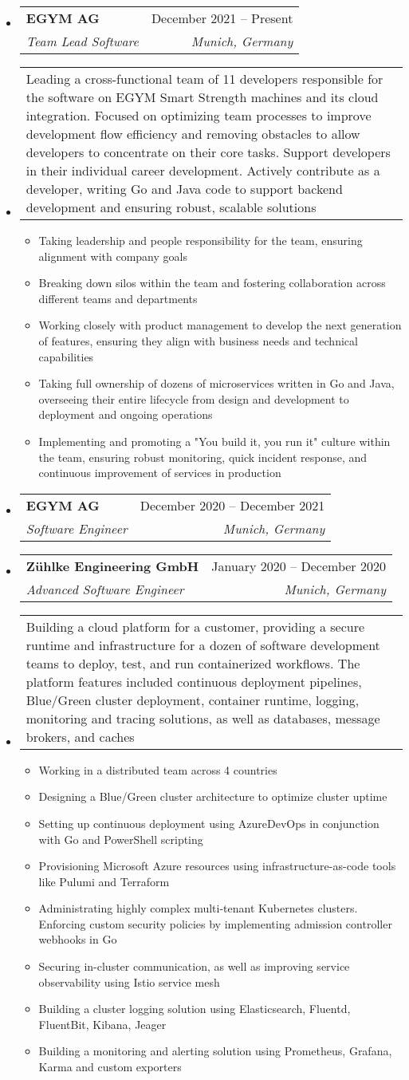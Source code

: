 \documentclass[letterpaper,12pt]{article}
\makeatletter
\newcommand{\resumeEntryStart}{\vspace{0.5\baselineskip}\begin{minipage}{\textwidth}\begin{itemize}[leftmargin=2.5mm]}
\newcommand{\resumeEntryEnd}{\end{itemize}\end{minipage}\vspace{1\baselineskip}}
\newcommand{\resumeItemListStart}{\begin{itemize}[leftmargin=4.5mm]}
\newcommand{\resumeItemListEnd}{\end{itemize}}
\newcommand{\resumeItem}[1]{
  \item\small{
    {#1 \vspace{-2pt}}
  }
}
\newcommand{\resumeEntryTSDL}[4]{
  \vspace{-1pt}\item[]
    \begin{tabularx}{0.97\textwidth}{X@{\hspace{60pt}}r}
      \textbf{\color{primary}#1} & {\color{accent}\small#2} \\
      \textit{\color{accent}\small#3} & \textit{\color{accent}\small#4} \\
    \end{tabularx}\vspace{-6pt}
}
\newcommand{\resumeEntryDesc}[1]{
  \vspace{-1pt}\item[] 
  \small{
    \begin{tabularx}{0.97\textwidth}{X}
      #1
    \end{tabularx}
  }
  \vspace{-6pt}
}
\makeatother
\begin{document}
  \resumeEntryStart
    \resumeEntryTSDL
      {EGYM AG}{December 2021 -- Present}
      {Team Lead Software}{Munich, Germany}
    \resumeEntryDesc{Leading a cross-functional team of 11 developers responsible for the software on EGYM Smart Strength machines and its cloud integration. Focused on optimizing team processes to improve development flow efficiency and removing obstacles to allow developers to concentrate on their core tasks. Support developers in their individual career development. Actively contribute as a developer, writing Go and Java code to support backend development and ensuring robust, scalable solutions}
    \resumeItemListStart
    \resumeItem {Taking leadership and people responsibility for the team, ensuring alignment with company goals}
    \resumeItem {Breaking down silos within the team and fostering collaboration across different teams and departments}
    \resumeItem {Working closely with product management to develop the next generation of features, ensuring they align with business needs and technical capabilities}
    \resumeItem {Taking full ownership of dozens of microservices written in Go and Java, overseeing their entire lifecycle from design and development to deployment and ongoing operations}
    \resumeItem {Implementing and promoting a "You build it, you run it" culture within the team, ensuring robust monitoring, quick incident response, and continuous improvement of services in production}
    \resumeItemListEnd
  \resumeEntryEnd

  \resumeEntryStart
    \resumeEntryTSDL
      {EGYM AG}{December 2020 -- December 2021}
      {Software Engineer}{Munich, Germany}
  \resumeEntryEnd

  \resumeEntryStart
    \resumeEntryTSDL
      {Zühlke Engineering GmbH}{January 2020 -- December 2020}
      {Advanced Software Engineer}{Munich, Germany}
    \resumeEntryDesc{Building a cloud platform for a customer, providing a secure runtime and infrastructure for a dozen of software development teams to deploy, test, and run containerized workflows. The platform features included continuous deployment pipelines, Blue/Green cluster deployment, container runtime, logging, monitoring and tracing solutions, as well as databases, message brokers, and caches}
    \resumeItemListStart
        \resumeItem {Working in a distributed team across 4 countries}
        \resumeItem {Designing a Blue/Green cluster architecture to optimize cluster uptime}
        \resumeItem {Setting up continuous deployment using AzureDevOps in conjunction with Go and PowerShell scripting}
        \resumeItem {Provisioning Microsoft Azure resources using infrastructure-as-code tools like Pulumi and Terraform}
        \resumeItem {Administrating highly complex multi-tenant Kubernetes clusters. Enforcing custom security policies by implementing admission controller webhooks in Go}
        \resumeItem {Securing in-cluster communication, as well as improving service observability using Istio service mesh}
        \resumeItem {Building a cluster logging solution using Elasticsearch, Fluentd, FluentBit, Kibana, Jeager}
        \resumeItem {Building a monitoring and alerting solution using Prometheus, Grafana, Karma and custom exporters}
    \resumeItemListEnd
  \resumeEntryEnd
\end{document}
